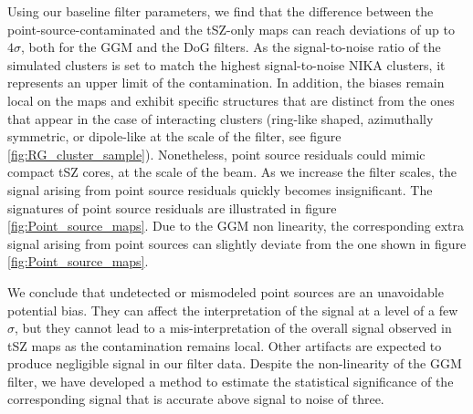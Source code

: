 \documentclass[twocolumn,traditabstract]{aa}
\begin{document}
Using our baseline filter parameters, we find that the difference between the point-source-contaminated and the tSZ-only maps can reach deviations of up to $4 \sigma$, both for the GGM and the DoG filters. As the signal-to-noise ratio of the simulated clusters is set to match the highest signal-to-noise NIKA clusters, it represents an upper limit of the contamination. In addition, the biases remain local on the maps and exhibit specific structures that are distinct from the ones that appear in the case of interacting clusters (ring-like shaped, azimuthally symmetric, or dipole-like at the scale of the filter, see figure \ref{fig:RG_cluster_sample}). Nonetheless, point source residuals could mimic compact tSZ cores, at the scale of the beam. As we increase the filter scales, the signal arising from point source residuals quickly becomes insignificant. The signatures of point source residuals are illustrated in figure \ref{fig:Point_source_maps}. Due to the GGM non linearity, the corresponding extra signal arising from point sources can slightly deviate from the one shown in figure \ref{fig:Point_source_maps}.

We conclude that undetected or mismodeled point sources are an unavoidable potential bias. They can affect the interpretation of the signal at a level of a few $\sigma$, but they cannot lead to a mis-interpretation of the overall signal observed in tSZ maps as the contamination remains local. Other artifacts are expected to produce negligible signal in our filter data. Despite the non-linearity of the GGM filter, we have developed a method to estimate the statistical significance of the corresponding signal that is accurate above signal to noise of three.

\end{document}

